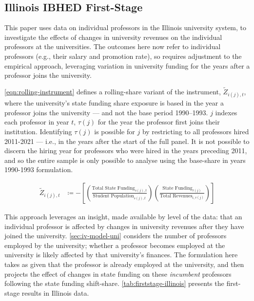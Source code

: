 \newpage
\subsection{Illinois IBHED First-Stage}
\label{sec:iv-model-indiv}

This paper uses data on individual professors in the Illinois university system, to investigate the effects of changes in university revenues on the individual professors at the universities.
The outcomes here now refer to individual professors (e.g., their salary and promotion rate), so requires adjustment to the empirical approach, leveraging variation in university funding for the years after a professor joins the university.

\autoref{eqn:rolling-instrument} defines a rolling-share variant of the instrument, $\tilde Z_{i(j),t}$, where the university's state funding share exposure is based in the year a professor joins the university --- and not the base period 1990--1993.
$j$ indexes each professor in year $t$, $\tau(j)$ for the year the professor first joins their institution.
Identifying $\tau(j)$ is possible for $j$ by restricting to all professors hired 2011-2021 --- i.e., in the years after the start of the full panel.
It is not possible to discern the hiring year for professors who  were hired in the years preceding 2011, and so the entire sample is only possible to analyse using the base-share in years 1990-1993 formulation.

\begin{align}
    \label{eqn:rolling-instrument}
    \tilde Z_{i(j),t} &\coloneqq - \left[
    \left( \frac{\text{Total State Funding}_{s(j),t}}{\text{Student Population}_{s(j),t}} \right)
    \left( \frac{\text{State Funding}_{\tau(j)}}{\text{Total Revenues}_{i,\tau(j)}} \right) \right]
\end{align}

This approach leverages an insight, made available by level of the data: that an individual professor is affected by changes in university revenues after they have joined the university.
\autoref{sec:iv-model-uni} considers the number of professors employed by the university; whether a professor becomes employed at the university is likely affected by that university's finances.
The formulation here takes as given that the professor is already employed at the university, and then projects the effect of changes in state funding on these \textit{incumbent} professors following the state funding shift-share.
\autoref{tab:firststage-illinois} presents the first-stage results in Illinois data.

